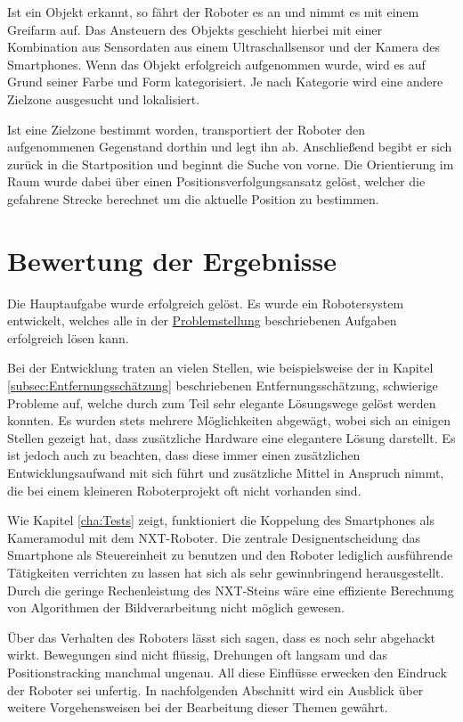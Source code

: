 Ist ein Objekt erkannt, so fährt der Roboter es an und nimmt es mit einem Greifarm auf. Das Ansteuern des Objekts geschieht hierbei mit einer Kombination aus Sensordaten aus einem Ultraschallsensor und der Kamera des Smartphones. Wenn das Objekt erfolgreich aufgenommen wurde, wird es auf Grund seiner Farbe und Form kategorisiert. Je nach Kategorie wird eine andere Zielzone ausgesucht und lokalisiert.

Ist eine Zielzone bestimmt worden, transportiert der Roboter den aufgenommenen Gegenstand dorthin und legt ihn ab. Anschließend begibt er sich zurück in die Startposition und beginnt die Suche von vorne. Die Orientierung im Raum wurde dabei über einen Positionsverfolgungsansatz gelöst, welcher die gefahrene Strecke berechnet um die aktuelle Position zu bestimmen.

\section{Bewertung der Ergebnisse}

Die Hauptaufgabe wurde erfolgreich gelöst. Es wurde ein Robotersystem entwickelt, welches alle in der \hyperref[cha:Problemstellung]{Problemstellung} beschriebenen Aufgaben erfolgreich lösen kann. 

Bei der Entwicklung traten an vielen Stellen, wie beispielsweise der in Kapitel \ref{subsec:Entfernungsschätzung} beschriebenen Entfernungsschätzung, schwierige Probleme auf, welche durch zum Teil sehr elegante Lösungswege gelöst werden konnten. Es wurden stets mehrere Möglichkeiten abgewägt, wobei sich an einigen Stellen gezeigt hat, dass zusätzliche Hardware eine elegantere Lösung darstellt. Es ist jedoch auch zu beachten, dass diese immer einen zusätzlichen Entwicklungsaufwand mit sich führt und zusätzliche Mittel in Anspruch nimmt, die bei einem kleineren Roboterprojekt oft nicht vorhanden sind. 

Wie Kapitel \ref{cha:Tests} zeigt, funktioniert die Koppelung des Smartphones als Kameramodul mit dem NXT-Roboter. Die zentrale Designentscheidung das Smartphone als Steuereinheit zu benutzen und den Roboter lediglich ausführende Tätigkeiten verrichten zu lassen hat sich als sehr gewinnbringend herausgestellt. Durch die geringe Rechenleistung des NXT-Steins wäre eine effiziente Berechnung von Algorithmen der Bildverarbeitung nicht möglich gewesen.

Über das Verhalten des Roboters lässt sich sagen, dass es noch sehr abgehackt wirkt. Bewegungen sind nicht flüssig, Drehungen oft langsam und das Positionstracking manchmal ungenau. All diese Einflüsse erwecken den Eindruck der Roboter sei unfertig. In nachfolgenden Abschnitt wird ein Ausblick über weitere Vorgehensweisen bei der Bearbeitung dieser Themen gewährt.

